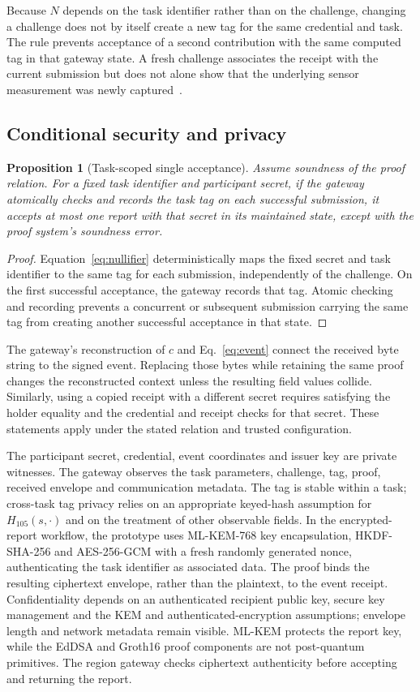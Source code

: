 \documentclass[pdflatex,iicol,sn-mathphys-num]{sn-jnl}
\newtheorem{proposition}{Proposition}
\begin{document}
Because $N$ depends on the task identifier rather than on the challenge, changing a challenge does not by itself create a new tag for the same credential and task. The rule prevents acceptance of a second contribution with the same computed tag in that gateway state. A fresh challenge associates the receipt with the current submission but does not alone show that the underlying sensor measurement was newly captured~\cite{Birkholz2023RATS}.

\subsection{Conditional security and privacy}
\label{sec:interpretation}

\begin{proposition}[Task-scoped single acceptance]
Assume soundness of the proof relation. For a fixed task identifier and participant secret, if the gateway atomically checks and records the task tag on each successful submission, it accepts at most one report with that secret in its maintained state, except with the proof system's soundness error.
\end{proposition}
\begin{proof}
Equation~\eqref{eq:nullifier} deterministically maps the fixed secret and task identifier to the same tag for each submission, independently of the challenge. On the first successful acceptance, the gateway records that tag. Atomic checking and recording prevents a concurrent or subsequent submission carrying the same tag from creating another successful acceptance in that state.
\end{proof}


The gateway's reconstruction of $c$ and Eq.~\eqref{eq:event} connect the received byte string to the signed event. Replacing those bytes while retaining the same proof changes the reconstructed context unless the resulting field values collide. Similarly, using a copied receipt with a different secret requires satisfying the holder equality and the credential and receipt checks for that secret. These statements apply under the stated relation and trusted configuration.

The participant secret, credential, event coordinates and issuer key are private witnesses. The gateway observes the task parameters, challenge, tag, proof, received envelope and communication metadata. The tag is stable within a task; cross-task tag privacy relies on an appropriate keyed-hash assumption for $H_{105}(s,\cdot)$ and on the treatment of other observable fields. In the encrypted-report workflow, the prototype uses ML-KEM-768 key encapsulation, HKDF-SHA-256 and AES-256-GCM with a fresh randomly generated nonce, authenticating the task identifier as associated data. The proof binds the resulting ciphertext envelope, rather than the plaintext, to the event receipt. Confidentiality depends on an authenticated recipient public key, secure key management and the KEM and authenticated-encryption assumptions; envelope length and network metadata remain visible. ML-KEM protects the report key, while the EdDSA and Groth16 proof components are not post-quantum primitives. The region gateway checks ciphertext authenticity before accepting and returning the report.
\end{document}
